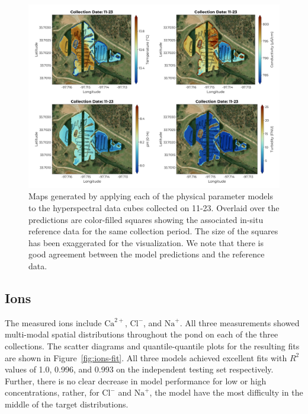 \documentclass[sensors,article,submit,pdftex,moreauthors]{Definitions/mdpi}
\begin{document}
\begin{figure}
\centering
\includegraphics[width=\columnwidth]{paper/figures/results/maps/physical.pdf}
\caption{Maps generated by applying each of the physical parameter models to the hyperspectral data cubes collected on 11-23. Overlaid over the predictions are color-filled squares showing the associated in-situ reference data for the same collection period. The size of the squares has been exaggerated for the visualization. We note that there is good agreement between the model predictions and the reference data. \label{fig:map-physical}}
\end{figure}  



\subsection{Ions}

The measured ions include $\mathrm{Ca}^{2+}$, $\mathrm{Cl}^{-}$, and $\mathrm{Na}^{+}$. All three measurements showed multi-modal spatial distributions throughout the pond on each of the three collections. The scatter diagrams and quantile-quantile plots for the resulting fits are shown in Figure~\ref{fig:ions-fit}. All three models achieved excellent fits with $R^2$ values of 1.0, 0.996, and 0.993 on the independent testing set respectively. Further, there is no clear decrease in model performance for low or high concentrations, rather, for $\textrm{Cl}^{-}$ and $\textrm{Na}^{+}$, the model have the most difficulty in the middle of the target distributions. 
\end{document}
